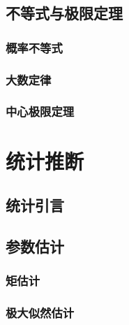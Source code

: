 \documentclass[zihao=-4,linespread=1.5,a4paper,heading=true,oneside]{ctexbook}
\theoremstyle{definition}
\begin{document}
\chapter{不等式与极限定理}\label{chap:5}
\section{概率不等式}\label{sec:5.1}

\section{大数定律}\label{sec:5.2}

\section{中心极限定理}\label{sec:5.3}


\part{统计推断}\label{part:2}

\chapter*{统计引言}\label{chap:preface2}


\chapter{参数估计}\label{chap:6}
\section{矩估计}\label{sec:6.1}

\section{极大似然估计}\label{sec:6.2}


\end{document}
